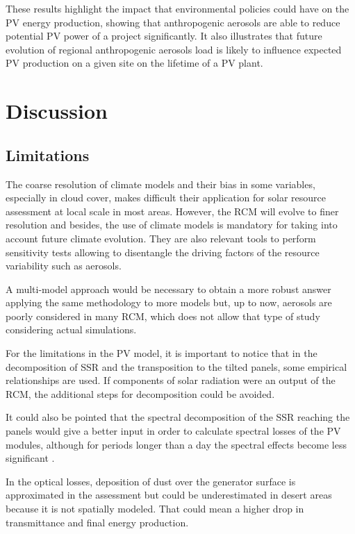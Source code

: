 These results highlight the impact that environmental policies could have on the PV energy production, showing that anthropogenic aerosols are able to reduce potential PV power of a project significantly. It also illustrates that future evolution of regional anthropogenic aerosols load is likely to influence expected PV production on a given site on the lifetime of a PV plant.

\section{Discussion}
\subsection{Limitations}

The coarse resolution of climate models and their bias in some variables, especially in cloud cover, makes difficult their application for solar resource assessment at local scale in most areas. However, the RCM will evolve to finer resolution and besides, the use of climate models is mandatory for taking into account future climate evolution. They are also relevant tools to perform sensitivity tests allowing to disentangle the driving factors of the resource variability such as aerosols. 

A multi-model approach would be necessary to obtain a more robust answer applying the same methodology to more models but, up to now, aerosols are poorly considered in many RCM, which does not allow that type of study considering actual simulations. 

For the limitations in the PV model, it is important to notice that in the decomposition of SSR and the transposition to the tilted panels, some empirical relationships are used. If components of solar radiation were an output of the RCM, the additional steps for decomposition could be avoided.

It could also be pointed that the spectral decomposition of the SSR reaching the panels would give a better input in order to calculate spectral losses of the PV modules, although for periods longer than a day the spectral effects become less significant \citep{Martin1999}.

In the optical losses, deposition of dust over the generator surface is approximated in the assessment but could be underestimated in desert areas because it is not spatially modeled. That could mean a higher drop in transmittance and final energy production.

